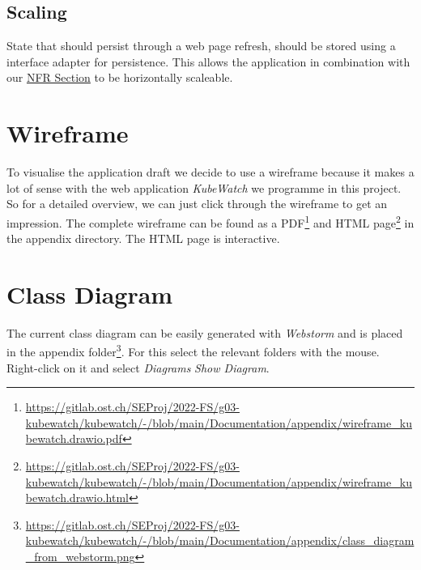 \subsection{Scaling}

State that should persist through a web page refresh, should be stored using a interface adapter for persistence. This allows the application in combination with our \hyperref[section:non-functional-requirements]{NFR Section} to be horizontally scaleable.

\section{Wireframe}

To visualise the application draft we decide to use a wireframe because it makes a lot of sense with the web application \textit{KubeWatch} we programme in this project. So for a detailed overview, we can just click through the wireframe to get an impression. The complete wireframe can be found as a PDF\footnote{\url{https://gitlab.ost.ch/SEProj/2022-FS/g03-kubewatch/kubewatch/-/blob/main/Documentation/appendix/wireframe_kubewatch.drawio.pdf}} and HTML page\footnote{\url{https://gitlab.ost.ch/SEProj/2022-FS/g03-kubewatch/kubewatch/-/blob/main/Documentation/appendix/wireframe_kubewatch.drawio.html}} in the appendix directory.
The HTML page is interactive.

\section{Class Diagram}
The current class diagram can be easily generated with \textit{Webstorm} and is placed in the appendix folder\footnote{\url{https://gitlab.ost.ch/SEProj/2022-FS/g03-kubewatch/kubewatch/-/blob/main/Documentation/appendix/class_diagram_from_webstorm.png}}.
For this select the relevant folders with the mouse.
Right-click on it and select \textit{Diagrams} \textrightarrow \textit{Show Diagram}.
